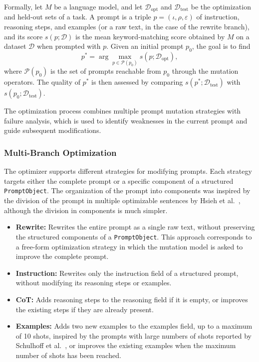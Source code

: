 \documentclass[pdflatex,sn-mathphys-num]{sn-jnl}%
\theoremstyle{thmstyleone}%
\theoremstyle{thmstyletwo}%
\theoremstyle{thmstylethree}%
\begin{document}
Formally, let \(M\) be a language model, and let \(\mathcal{D}_{\text{opt}}\) and 
\(\mathcal{D}_{\text{test}}\) be the optimization and held-out sets of a task. 
A prompt is a triple \(p=(\iota,\rho,\varepsilon)\) of instruction, reasoning steps, 
and examples (or a raw text, in the case of the rewrite branch), and its score 
\(s(p;\mathcal{D})\) is the mean keyword-matching score obtained by \(M\) on a dataset 
\(\mathcal{D}\) when prompted with \(p\). Given an initial prompt \(p_0\), the goal is 
to find
\begin{equation}
p^{\ast}=\arg\max_{p\in\mathcal{P}(p_0)} s(p;\mathcal{D}_{\text{opt}}),
\end{equation}
where \(\mathcal{P}(p_0)\) is the set of prompts reachable from \(p_0\) through the 
mutation operators. The quality of \(p^{\ast}\) is then assessed by comparing 
\(s(p^{\ast};\mathcal{D}_{\text{test}})\) with \(s(p_0;\mathcal{D}_{\text{test}})\).

The optimization process combines multiple prompt mutation strategies
with failure analysis, which is used to identify weaknesses in the
current prompt and guide subsequent modifications.

\subsubsection{Multi-Branch Optimization}

The optimizer supports different strategies for modifying prompts.
Each strategy targets either the complete prompt or a specific
component of a structured \texttt{PromptObject}. The organization of the
prompt into components was inspired by the division of the prompt in multiple 
optimizable sentences by Hsieh et al.~\cite{hsieh2024}, although
the division in components is much simpler.

\begin{itemize}

    \item \textbf{Rewrite:} Rewrites the entire prompt as a single raw
          text, without preserving the structured components of a
          \texttt{PromptObject}. This approach corresponds to a
          free-form optimization strategy in which the mutation model
          is asked to improve the complete prompt.

    \item \textbf{Instruction:} Rewrites only the instruction field of
          a structured prompt, without modifying its reasoning
          steps or examples.

    \item \textbf{CoT:} Adds reasoning steps to the reasoning field if
          it is empty, or improves the existing steps if they are
          already present.

    \item \textbf{Examples:} Adds two new examples to the examples
          field, up to a maximum of 10 shots, inspired by the prompts
          with large numbers of shots reported by Schulhoff et
          al.~\cite{schulhoff2024}, or improves the existing examples when the maximum
          number of shots has been reached.

\end{itemize}
\end{document}
